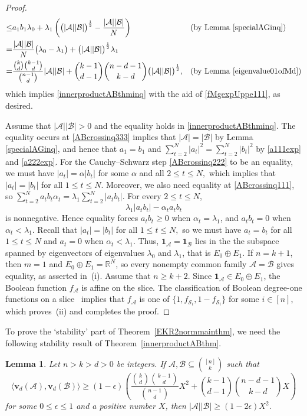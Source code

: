 \documentclass[11pt]{article}
\numberwithin{equation}{section}
\newtheorem{lemma}[theorem]{Lemma}
\def\A{\mathcal{A}}
\def\B{\mathcal{B}}
\def\S{\mathcal{S}}
\def\v{\mathbf{v}}
\def\1{\mathbf{1}}
\begin{document}
\begin{proof}
\begin{align}
\leq &
a_1 b_1 \lambda _0 + \lambda _1\left( \big(|\A||\B|\big)^{\frac{1}{2}}- \frac{|\A||\B|}{N} \right)&& \text {(by Lemma \ref{specialAGinq})} \\  \nonumber
=& \frac{|\A||\B|}{N} \big(\lambda _0-\lambda _1\big)+\big(|\A||\B|\big)^{\frac{1}{2}}\lambda _1\\\label{ABcrossinq444}
=&\frac{\binom{k}{d}\binom{k-1}{d}}{\binom{n-1}{d}}|\A||\B|
+\binom{k-1}{d-1} \binom{n-d-1}{k-d}\big(|\A||\B|\big)^{\frac{1}{2}},
&& \text {(by Lemma \ref{eigenvalue01ofMd})}%
\end{align}
which implies \eqref{innerproductABthminq} with the aid of \eqref{fMgexpUppe111}, as desired.


Assume that  $|\A||\B|>0$ and
the equality holds in \eqref{innerproductABthminq}.
The equality occurs at \eqref{ABcrossinq333} implies that $|\A|=|\B|$ by Lemma \ref{specialAGinq}, and hence that
$a_1 =b_1 $ and $\sum_{t=2}^N |a_t|^2=\sum_{t=2}^N |b_t|^2$ by  \eqref{a111exp} and \eqref{a222exp}.
For the Cauchy--Schwarz step \eqref{ABcrossinq222} to be an equality,
we must have $|a_t|= \alpha |b_t|$ for some $\alpha$ and all $2\leq t \leq N,$
which implies that $|a_t|= |b_t|$ for all $1\leq t \leq N.$
Moreover,
we also need equality at \eqref{ABcrossinq111},
so
$\sum_{t=2}^N a_t b_t \alpha_t=\lambda _1 \sum_{t=2}^N |a_t b_t |$.
For every $2\leq t\leq N$,
$$\lambda_1|a_tb_t|-\alpha_ta_tb_t$$
is nonnegative.
Hence equality forces $a_tb_t\geq 0$ when
$\alpha_t=\lambda_1$, and $a_tb_t=0$ when $\alpha_t<\lambda_1$.
Recall that $|a_t|= |b_t|$ for all $1\leq t \leq N,$
so we must have
$a_t= b_t$ for all $1\leq t \leq N$ and $a_t=0$ when $\alpha_t< \lambda _1$.
Thus, $\1_\A =\1_\B$ lies in the
the subspace spanned by eigenvectors of eigenvalues $\lambda _0$ and $\lambda _1$, that is $E_0\oplus E_1.$
If $n=k+1$, then $m=1$ and $E_0\oplus E_1=\mathbb R^N$, so every
nonempty common family $\A=\B$ gives equality, as asserted in~(i).
Assume that $n\geq k+2$.
Since $\1_\A\in E_0\oplus E_1$, the Boolean
function $f_\A$ is affine on the slice.  The classification of Boolean
degree-one functions on a slice~\cite[Lemma~3.4]{Filmus} implies that
$f_\A$ is one of $\{1, f_{\S_i},1-f_{\S_i}\}$ for some
$i\in [n]$, which  proves~(ii) and completes the proof.
\end{proof}

To prove the `stability' part of Theorem~\ref{EKR2normmainthm}, we need the following stability result of
Theorem~\ref{innerproductABthm}.

\begin{lemma}\label{stabilitylemmaip}
Let $n>k>d>0$ be integers.
If $\A,\B\subseteq \binom{[n]}{k}$ such that
$$\big\langle\v_d(\A),\v_d(\B)\big\rangle\geq (1-\epsilon)\left(\frac{\binom{k}{d}\binom{k-1}{d}}{\binom{n-1}{d}} X^2
+\binom{k-1}{d-1} \binom{n-d-1}{k-d} X \right)$$
for some $0\leq \epsilon \leq 1$ and a positive number $X$, then
$|\A||\B|\geq (1-2\epsilon)X^2.$
\end{lemma}
\end{document}
